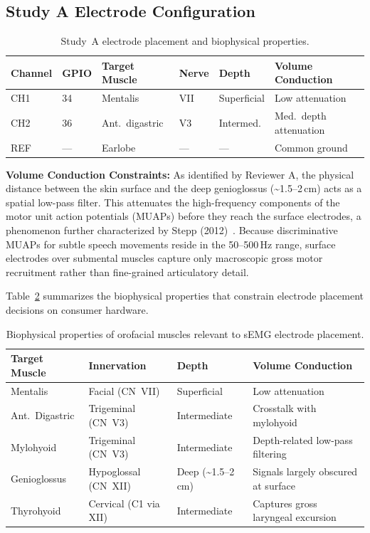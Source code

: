 \documentclass[11pt, a4paper]{article}
\begin{document}
\subsection{Study A Electrode Configuration}

\begin{table}[ht]
\centering
\caption{Study~A electrode placement and biophysical properties.}
\label{tab:electrodes}
\begin{tabular}{@{}llllll@{}}
\toprule
Channel & GPIO & Target Muscle & Nerve & Depth & Volume Conduction \\
\midrule
CH1 & 34 & Mentalis & VII & Superficial & Low attenuation \\
CH2 & 36 & Ant.\ digastric & V3 & Intermed. & Med.\ depth attenuation \\
REF & --- & Earlobe & --- & --- & Common ground \\
\bottomrule
\end{tabular}
\end{table}

\textbf{Volume Conduction Constraints:} As identified by Reviewer A, the physical distance between the skin surface and the deep genioglossus (\textasciitilde1.5--2\,cm) acts as a spatial low-pass filter. This attenuates the high-frequency components of the motor unit action potentials (MUAPs) before they reach the surface electrodes, a phenomenon further characterized by Stepp (2012)~\cite{stepp2012}. Because discriminative MUAPs for subtle speech movements reside in the 50--500\,Hz range, surface electrodes over submental muscles capture only macroscopic gross motor recruitment rather than fine-grained articulatory detail.

Table~\ref{tab:innervation} summarizes the biophysical properties that constrain electrode placement decisions on consumer hardware.

\begin{table}[ht]
\centering
\caption{Biophysical properties of orofacial muscles relevant to sEMG electrode placement.}
\label{tab:innervation}
\begin{tabular}{@{}llll@{}}
\toprule
Target Muscle & Innervation & Depth & Volume Conduction \\
\midrule
Mentalis & Facial (CN~VII) & Superficial & Low attenuation \\
Ant.\ Digastric & Trigeminal (CN~V3) & Intermediate & Crosstalk with mylohyoid \\
Mylohyoid & Trigeminal (CN~V3) & Intermediate & Depth-related low-pass filtering \\
Genioglossus & Hypoglossal (CN~XII) & Deep (\textasciitilde1.5--2\,cm) & Signals largely obscured at surface \\
Thyrohyoid & Cervical (C1 via XII) & Intermediate & Captures gross laryngeal excursion \\
\bottomrule
\end{tabular}
\end{table}
\end{document}

